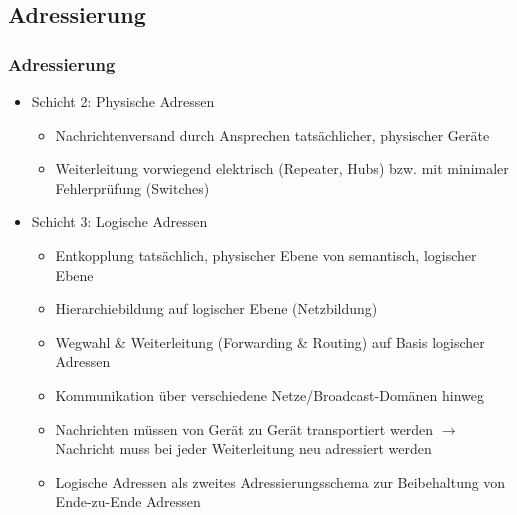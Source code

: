 \documentclass[xcolor=dvipsnames, aspectratio=169]{beamer}
\begin{document}
\subsection{Adressierung}
\begin{frame}
	\frametitle{Adressierung}
	\vspace{-0.75cm}
	\begin{itemize}
		\item Schicht 2: Physische Adressen
		\begin{itemize}
			\item Nachrichtenversand durch Ansprechen tatsächlicher, physischer Geräte
			\item Weiterleitung vorwiegend elektrisch (Repeater, Hubs) bzw. mit minimaler Fehlerprüfung (Switches)
		\end{itemize}
		\item Schicht 3: Logische Adressen
		\begin{itemize}
			\item Entkopplung tatsächlich, physischer Ebene von semantisch, logischer Ebene
			\item Hierarchiebildung auf logischer Ebene (Netzbildung)
			\item Wegwahl \& Weiterleitung (Forwarding \& Routing) auf Basis logischer Adressen
			\item Kommunikation über verschiedene Netze/Broadcast-Domänen hinweg
			\item Nachrichten müssen von Gerät zu Gerät transportiert werden $\rightarrow$ Nachricht muss
bei jeder Weiterleitung neu adressiert werden
			\item Logische Adressen als zweites Adressierungsschema zur Beibehaltung von Ende-zu-Ende Adressen
		\end{itemize}
	\end{itemize}
\end{frame}
\end{document}
